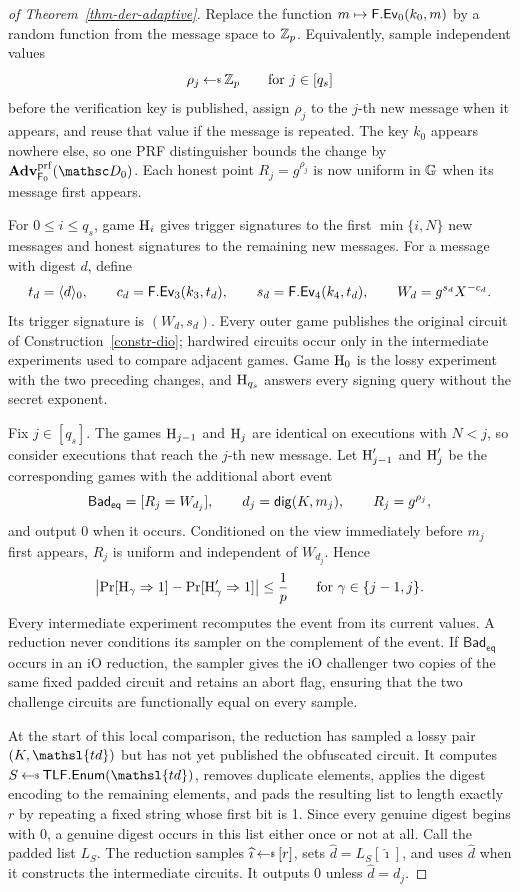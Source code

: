 \begin{proof}[of Theorem~\ref{thm-der-adaptive}]
 Replace the function $m\mapsto\mathsf{F}.\mathsf{Ev}_0(k_0,m)$ by a random function from the message space to $\mathbb Z_p$. Equivalently, sample independent values
$$
\rho_j\getsr\Zp\qquad\text{for }j\in[q_s]
$$
before the verification key is published, assign $\rho_j$ to the $j$-th new message when it appears, and reuse that value if the message is repeated. The key $k_0$ appears nowhere else, so one PRF distinguisher bounds the change by $\AdvPRF{\PRF_0}{\advD_0}$. Each honest point $R_j=g^{\rho_j}$ is now uniform in $\mathbb{G}$ when its message first appears.

 For $0\le i\le q_s$, game $\textnormal{H}_i$ gives trigger signatures to the first $\min\{i,N\}$ new messages and honest signatures to the remaining new messages. For a message with digest $d$, define
$$
t_d=\langle d \rangle_0,
\qquad
c_d=\mathsf{F}.\mathsf{Ev}_3(k_3,t_d),
\qquad
s_d=\mathsf{F}.\mathsf{Ev}_4(k_4,t_d),
\qquad
W_d=g^{s_d}X^{-c_d}.
$$
Its trigger signature is $(W_d,s_d)$. Every outer game publishes the original circuit of Construction~\ref{constr-dio}; hardwired circuits occur only in the intermediate experiments used to compare adjacent games. Game $\textnormal{H}_0$ is the lossy experiment with the two preceding changes, and $\textnormal{H}_{q_s}$ answers every signing query without the secret exponent.

 Fix $j\in[q_s]$. The games $\textnormal{H}_{j-1}$ and $\textnormal{H}_j$ are identical on executions with $N<j$, so consider executions that reach the $j$-th new message. Let $\textnormal{H}'_{j-1}$ and $\textnormal{H}'_j$ be the corresponding games with the additional abort event
$$
\mathsf{Bad}_{\mathsf{eq}}=[R_j=W_{d_j}],
\qquad
d_j=\mathsf{dig}(K,m_j),
\qquad
R_j=g^{\rho_j},
$$
and output 0 when it occurs. Conditioned on the view immediately before $m_j$ first appears, $R_j$ is uniform and independent of $W_{d_j}$. Hence
$$
\left|\Pr[\textnormal{H}_\gamma\Rightarrow1]-\Pr[\textnormal{H}'_\gamma\Rightarrow1]\right|\le\frac1p
\qquad\text{for }\gamma\in\{j-1,j\}.
$$
Every intermediate experiment recomputes the event from its current values. A reduction never conditions its sampler on the complement of the event. If $\mathsf{Bad}_{\mathsf{eq}}$ occurs in an iO reduction, the sampler gives the iO challenger two copies of the same fixed padded circuit and retains an abort flag, ensuring that the two challenge circuits are functionally equal on every sample.

 At the start of this local comparison, the reduction has sampled a lossy pair $(K,\mathsl{td})$ but has not yet published the obfuscated circuit. It computes $S\getsr\TLFEnum(\mathsl{td})$, removes duplicate elements, applies the digest encoding to the remaining elements, and pads the resulting list to length exactly $r$ by repeating a fixed string whose first bit is 1. Since every genuine digest begins with 0, a genuine digest occurs in this list either once or not at all. Call the padded list $L_S$. The reduction samples $\widehat\imath\getsr[r]$, sets $\widehat d=L_S[\widehat\imath]$, and uses $\widehat d$ when it constructs the intermediate circuits. It outputs 0 unless $\widehat d=d_j$.


\end{proof}
